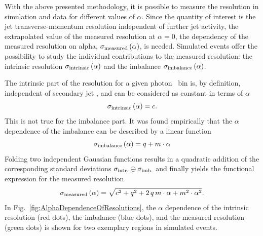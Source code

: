 With the above presented methodology, it is possible to measure the resolution in simulation and data for different values of $\alpha$.
Since the quantity of interest is the jet transverse-momentum resolution independent of further jet activity, \ie the extrapolated value of the measured resolution at $\alpha=0$, 
the dependency of the measured resolution on alpha, $\sigma_\mathrm{measured} \left( \alpha \right)$, is needed.
Simulated events offer the possibility to study the individual contributions to the measured resolution: the intrinsic resolution $\sigma_\mathrm{intrinsic}\left( \alpha \right)$ and the imbalance $\sigma_\mathrm{imbalance}\left( \alpha \right)$.%

The intrinsic part of the resolution for a given photon \pt~bin is, by definition, independent of secondary jet \pt, and can be considered as constant in terms of $\alpha$
\begin{equation}\label{eq:intrinsic}
 \sigma_\mathrm{intrinsic} \left( \alpha\right) = c.
\end{equation}
This is not true for the imbalance part. 
It was found empirically that the $\alpha$ dependence of the imbalance can be described by a linear function~\cite{CMS:PAS:JETResolution_7TeV} 
\begin{equation}\label{eq:imbalance}
  \sigma_\mathrm{imbalance} \left( \alpha\right) = q + m \cdot \alpha
\end{equation}
Folding two independent Gaussian functions results in a quadratic addition of the corresponding standard deviations $\sigma_\mathrm{intr.}\oplus\sigma_\mathrm{imb.}$ and finally yields the functional expression for the measured resolution
\begin{equation}\label{eq:total}
  \sigma_\mathrm{measured} \left( \alpha \right) = \sqrt{ c^2 + q^2  + 2\, q\, m \cdot \alpha +m^2 \cdot \alpha^2}. 
\end{equation}
In Fig.~\ref{fig:AlphaDependenceOfResolutions}, the $\alpha$ dependence of the intrinsic resolution (red dots), the imbalance (blue dots), and the measured resolution (green dots) is shown for two exemplary \ptgamma regions in simulated events. 
